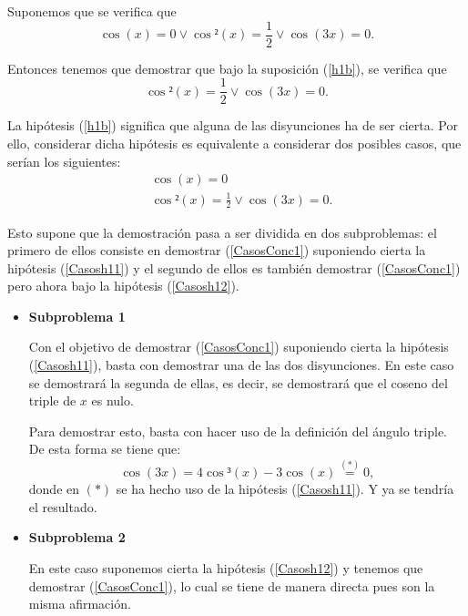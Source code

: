 \begin{demostracion}
  \noindent
  \framebox{\longrightarrow} Suponemos que se verifica que
  \begin{equation}\label{Casosh1}\tag{h1}
    \cos(x)=0 \lor \cos²(x)=\frac{1}{2} \lor \cos(3x)=0.
  \end{equation}

  Entonces tenemos que demostrar que bajo la suposición (\ref{h1b}),
  se verifica que
  \begin{equation}\label{CasosConc1}
     \cos²(x)=\frac{1}{2} \lor \cos(3x)=0.
  \end{equation}

  La hipótesis (\ref{h1b}) significa que alguna de las disyunciones
  ha de ser cierta. Por ello, considerar dicha hipótesis es
  equivalente a considerar dos posibles casos, que serían los
  siguientes:
  \begin{align}
    &\cos(x)=0 \label{Casosh11}\tag{h11}\\
    &\cos²(x)=\frac{1}{2}\lor \cos(3x)=0. \label{Casosh12}\tag{h12}
  \end{align}

  Esto supone que la demostración pasa a ser dividida en
  dos subproblemas: el primero de
  ellos consiste en demostrar (\ref{CasosConc1}) suponiendo
  cierta la hipótesis (\ref{Casosh11}) y el segundo de ellos
  es también demostrar (\ref{CasosConc1}) pero ahora bajo la
  hipótesis (\ref{Casosh12}).

  \begin{itemize}
  \item \textbf{Subproblema 1}

    Con el objetivo de demostrar (\ref{CasosConc1}) suponiendo
    cierta la hipótesis (\ref{Casosh11}), basta con demostrar una
    de las dos disyunciones. En este caso se demostrará la segunda
    de ellas, es decir, se demostrará que el coseno del triple de
    \(x\) es nulo.

    Para demostrar esto, basta con hacer uso de la definición del
    ángulo triple. De esta forma se tiene que:
    \begin{equation}
      \cos(3x)=4\cos³(x)-3\cos(x)\stackrel{(*)}{=}0,
    \end{equation}
    donde en \((*)\) se ha hecho uso de la hipótesis
    (\ref{Casosh11}). Y ya se tendría el resultado.

  \item \textbf{Subproblema 2}

    En este caso suponemos cierta la hipótesis (\ref{Casosh12})
    y tenemos que demostrar (\ref{CasosConc1}), lo cual se tiene
    de manera directa pues son la misma afirmación.
  \end{itemize}


\end{demostracion}
